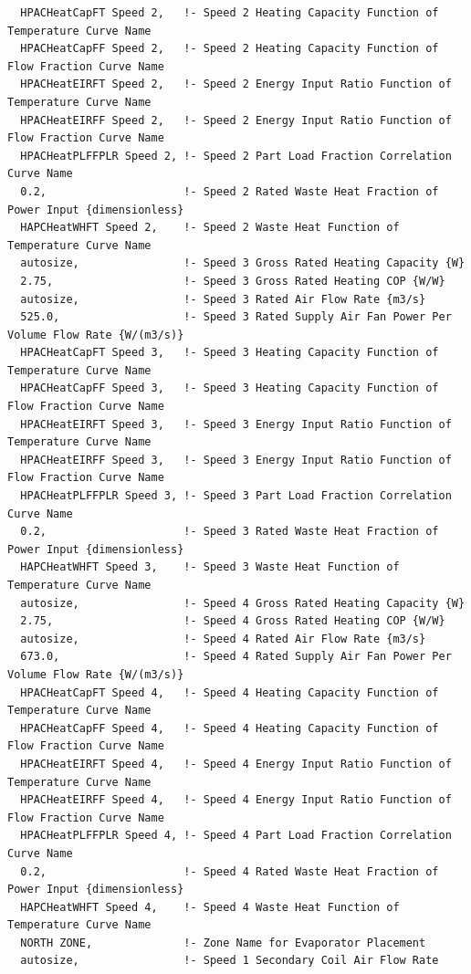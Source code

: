 \begin{lstlisting}
  HPACHeatCapFT Speed 2,   !- Speed 2 Heating Capacity Function of Temperature Curve Name
  HPACHeatCapFF Speed 2,   !- Speed 2 Heating Capacity Function of Flow Fraction Curve Name
  HPACHeatEIRFT Speed 2,   !- Speed 2 Energy Input Ratio Function of Temperature Curve Name
  HPACHeatEIRFF Speed 2,   !- Speed 2 Energy Input Ratio Function of Flow Fraction Curve Name
  HPACHeatPLFFPLR Speed 2, !- Speed 2 Part Load Fraction Correlation Curve Name
  0.2,                     !- Speed 2 Rated Waste Heat Fraction of Power Input {dimensionless}
  HAPCHeatWHFT Speed 2,    !- Speed 2 Waste Heat Function of Temperature Curve Name
  autosize,                !- Speed 3 Gross Rated Heating Capacity {W}
  2.75,                    !- Speed 3 Gross Rated Heating COP {W/W}
  autosize,                !- Speed 3 Rated Air Flow Rate {m3/s}
  525.0,                   !- Speed 3 Rated Supply Air Fan Power Per Volume Flow Rate {W/(m3/s)}
  HPACHeatCapFT Speed 3,   !- Speed 3 Heating Capacity Function of Temperature Curve Name
  HPACHeatCapFF Speed 3,   !- Speed 3 Heating Capacity Function of Flow Fraction Curve Name
  HPACHeatEIRFT Speed 3,   !- Speed 3 Energy Input Ratio Function of Temperature Curve Name
  HPACHeatEIRFF Speed 3,   !- Speed 3 Energy Input Ratio Function of Flow Fraction Curve Name
  HPACHeatPLFFPLR Speed 3, !- Speed 3 Part Load Fraction Correlation Curve Name
  0.2,                     !- Speed 3 Rated Waste Heat Fraction of Power Input {dimensionless}
  HAPCHeatWHFT Speed 3,    !- Speed 3 Waste Heat Function of Temperature Curve Name
  autosize,                !- Speed 4 Gross Rated Heating Capacity {W}
  2.75,                    !- Speed 4 Gross Rated Heating COP {W/W}
  autosize,                !- Speed 4 Rated Air Flow Rate {m3/s}
  673.0,                   !- Speed 4 Rated Supply Air Fan Power Per Volume Flow Rate {W/(m3/s)}
  HPACHeatCapFT Speed 4,   !- Speed 4 Heating Capacity Function of Temperature Curve Name
  HPACHeatCapFF Speed 4,   !- Speed 4 Heating Capacity Function of Flow Fraction Curve Name
  HPACHeatEIRFT Speed 4,   !- Speed 4 Energy Input Ratio Function of Temperature Curve Name
  HPACHeatEIRFF Speed 4,   !- Speed 4 Energy Input Ratio Function of Flow Fraction Curve Name
  HPACHeatPLFFPLR Speed 4, !- Speed 4 Part Load Fraction Correlation Curve Name
  0.2,                     !- Speed 4 Rated Waste Heat Fraction of Power Input {dimensionless}
  HAPCHeatWHFT Speed 4,    !- Speed 4 Waste Heat Function of Temperature Curve Name
  NORTH ZONE,              !- Zone Name for Evaporator Placement
  autosize,                !- Speed 1 Secondary Coil Air Flow Rate

\end{lstlisting}
